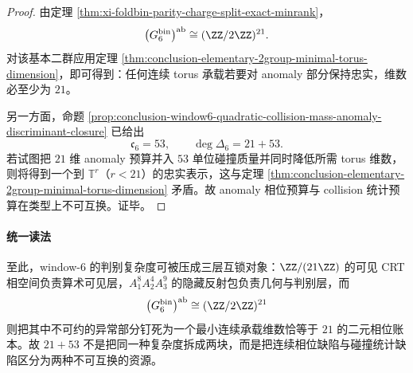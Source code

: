 \begin{proof}
由定理 \ref{thm:xi-foldbin-parity-charge-split-exact-minrank}，
\[
\bigl(G_6^{\mathrm{bin}}\bigr)^{\mathrm{ab}}\cong (\ZZ/2\ZZ)^{21}.
\]
对该基本二群应用定理 \ref{thm:conclusion-elementary-2group-minimal-torus-dimension}，即可得到：任何连续 torus 承载若要对 anomaly 部分保持忠实，维数必至少为 \(21\)。

另一方面，命题 \ref{prop:conclusion-window6-quadratic-collision-mass-anomaly-discriminant-closure} 已给出
\[
\mathfrak c_6=53,
\qquad
\deg\Delta_6=21+53.
\]
若试图把 \(21\) 维 anomaly 预算并入 \(53\) 单位碰撞质量并同时降低所需 torus 维数，则将得到一个到 \(\mathbb T^r\)（\(r<21\)）的忠实表示，这与定理 \ref{thm:conclusion-elementary-2group-minimal-torus-dimension} 矛盾。故 anomaly 相位预算与 collision 统计预算在类型上不可互换。证毕。
\end{proof}

\paragraph{统一读法}
至此，window-\(6\) 的判别复杂度可被压成三层互锁对象：\(\ZZ/(21\ZZ)\) 的可见 CRT 相空间负责算术可见层，\(A_1^8A_2^4A_3^9\) 的隐藏反射包负责几何与判别层，而
\[
\bigl(G_6^{\mathrm{bin}}\bigr)^{\mathrm{ab}}\cong (\ZZ/2\ZZ)^{21}
\]
则把其中不可约的异常部分钉死为一个最小连续承载维数恰等于 \(21\) 的二元相位账本。故 \(21+53\) 不是把同一种复杂度拆成两块，而是把连续相位缺陷与碰撞统计缺陷区分为两种不可互换的资源。

\endinput
